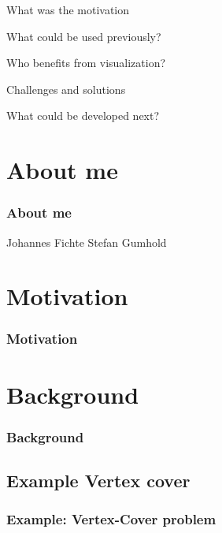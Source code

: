 \documentclass[c,8pt,xcolor...,x11names]{beamer}
\begin{document}
\begin{frame}
	\customtitle
	\begin{list2}
		\item {\sc What} was the motivation
		\item {\sc What} could be used previously?
		\item {\sc Who} benefits from visualization?
		\item {\sc Challenges} and solutions
		\item {\sc What} could be developed next?
	\end{list2}
\end{frame}

\section{About me} %

\begin{frame}
	\frametitle{About me}

	Johannes Fichte
	Stefan Gumhold

\end{frame}

\section{Motivation}

\begin{frame}
	\frametitle{Motivation}

\end{frame}

\section{Background}
\begin{frame}
	\frametitle{Background}

\end{frame}

\subsection{Example Vertex cover}
\begin{frame}
	\frametitle[Vertex Cover]{Example: Vertex-Cover problem}

\end{frame}
\end{document}
